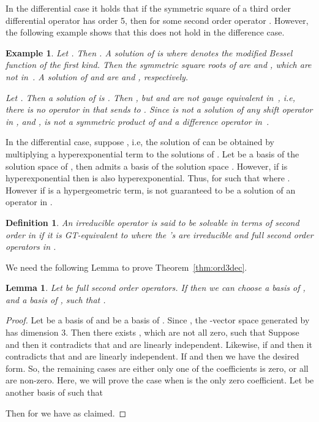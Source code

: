 \documentclass{article}
\newtheorem{lemma}[theorem]{Lemma}
\newtheorem{definition}[theorem]{Definition}
\newtheorem{example}[theorem]{Example}
\begin{document}
In the differential case it holds that if the symmetric square of a third order
differential operator  has order 5, then  for
some second order operator .  However, the following example
shows that this does not hold in the difference case.

\begin{example}
\label{example:symp}
Let . Then . A solution of  is  where  denotes the
modified Bessel function of the first kind.  Then the symmetric square roots of  are
 and
, which are not in~.  A solution of
 and  are  and , respectively.




Let . Then a solution of  is .  Then , but  and  are not gauge equivalent in~, i.e, there is no
operator in  that sends  to .
Since  is not a solution of 
any shift operator in , \cite[Theorem 5.2]{FlajoletGerholdSalvy05}and \cite[Lemma A.2]{Chen2012111},  is not a symmetric product of  and a difference
operator in~.


\end{example}





In the differential case, suppose , i.e, the
  solution of  can be obtained by multiplying a hyperexponential term  to the
  solutions of . Let  be a basis of the solution space of
  , then  admits a basis of the solution space .
  However, if  is hyperexponential then  is also hyperexponential. Thus,
   for  such that  where .  However if  is a
  hypergeometric term,  is not guaranteed to be a solution of an operator in .




\begin{definition}\label{def:gauge-equ}
  An irreducible operator  is said to be {\emph solvable in terms of second order in } if it is
  GT-equivalent to  where the 's
  are irreducible and full second order operators in .
\end{definition}

We need the following Lemma to prove Theorem~\ref{thm:ord3dec}.  


\begin{lemma}\label{symbs}
  Let  be full second order operators. 
If  then 
we can choose a basis  of , and a basis  of , such that .

\end{lemma}


\begin{proof}
  Let  be a basis of  and  be a basis of .
  Since , the -vector space generated by  has dimension 3. Then there exists , which are
  not all zero, such that  Suppose 
  and  then it contradicts that  and  are linearly independent.
  Likewise, if  and  then it contradicts that  and  are
  linearly independent.  If  and  then we have the desired form.
  So, the remaining cases are either only one of the coefficients  is zero,
  or all  are non-zero.  Here, we will prove the case when  is the
  only zero coefficient.  Let  be another basis of 
  such that

Then for  we have  as claimed.
\end{proof}
\end{document}
